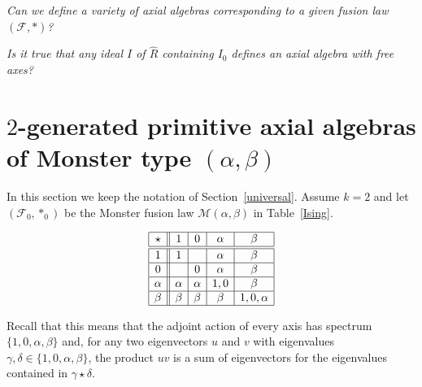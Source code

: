 \documentclass[a4paper]{amsart}
\newtheorem{remark}[lemma]{Remark}
\newcommand{\aR}{{\hat R}}
\newcommand{\al}{\alpha}
\newcommand{\bt}{\beta}
\newcommand{\gm}{\gamma}
\newcommand{\dl}{\delta}
\newcommand{\Mab}{\mathcal M(\al,\bt)}
\begin{document}

\bigskip
{}
{\it Can we define a variety of axial algebras corresponding to a given fusion law $(\mathcal F,\ast)$?}

{\it  Is it true that any ideal $I$ of $\aR$ containing $I_0$ defines an axial algebra with free axes?}






 
\section{$2$-generated primitive axial algebras of Monster type $(\alpha, \beta)$}\label{table}


In this section we keep the notation of Section~\ref{universal}. Assume $k=2$ and let $(\mathcal F_0, \ast_0)$ be the Monster fusion law $\Mab$ in Table~\ref{Ising}.
%
\begin{table}
$$ 
\begin{array}{|c||c|c|c|c|}
\hline
\star & 1 & 0 & \al & \bt\\
\hline
\hline
1 & 1 & & \al & \bt\\
\hline
0 & & 0 & \al & \bt\\
\hline
\al & \al & \al & 1,0 & \bt\\
\hline
\bt & \bt & \bt & \bt & 1,0,\al\\
\hline
\end{array}
$$
\caption{Fusion law $\Mab$} \label{Ising}
\end{table}
Recall that this means that the adjoint action of every axis has spectrum 
$\{1,0,\al,\bt\}$ and, for any two eigenvectors $u$ and $v$ with eigenvalues 
$\gm,\dl\in\{1,0,\al,\bt\}$, the product $uv$ is a sum of eigenvectors for 
the eigenvalues contained in $\gm\star\dl$. 
\end{document}
